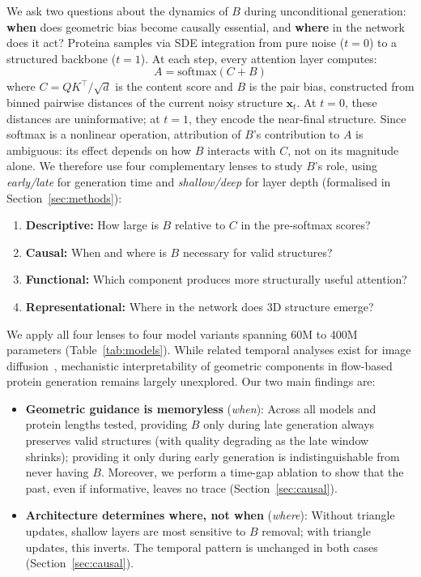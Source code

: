 \documentclass{article}
\begin{document}
We ask two questions about the dynamics of $B$ during unconditional generation: \textbf{when} does geometric bias become causally essential, and \textbf{where} in the network does it act?
Proteina samples via SDE integration from pure noise ($t{=}0$) to a structured backbone ($t{=}1$).
At each step, every attention layer computes:
\begin{equation}
    A = \mathrm{softmax}(C + B)
    \label{eq:attention}
\end{equation}
where $C = QK^\top / \sqrt{d}$ is the content score and $B$ is the pair bias, constructed from binned pairwise distances of the current noisy structure $\mathbf{x}_t$.
At $t{=}0$, these distances are uninformative; at $t{=}1$, they encode the near-final structure.
Since softmax is a nonlinear operation, attribution of $B$'s contribution to $A$ is ambiguous: its effect depends on how $B$ interacts with $C$, not on its magnitude alone. We therefore use four complementary lenses to study $B$'s role, using \emph{early/late} for generation time and \emph{shallow/deep} for layer depth (formalised in Section~\ref{sec:methods}):
\begin{enumerate}
    \item \textbf{Descriptive:} How large is $B$ relative to $C$ in the pre-softmax scores?
    \item \textbf{Causal:} When and where is $B$ necessary for valid structures?
    \item \textbf{Functional:} Which component produces more structurally useful attention?
    \item \textbf{Representational:} Where in the network does 3D structure emerge?
\end{enumerate}
We apply all four lenses to four model variants spanning 60M to 400M parameters (Table~\ref{tab:models}).
While related temporal analyses exist for image diffusion~\citep{kynkaanniemi2024guidance}, mechanistic interpretability of geometric components in flow-based protein generation remains largely unexplored.
Our two main findings are:
\begin{itemize}
    \item \textbf{Geometric guidance is memoryless} (\emph{when}): Across all models and protein lengths tested, providing $B$ only during late generation always preserves valid structures (with quality degrading as the late window shrinks); providing it only during early generation is indistinguishable from never having $B$. Moreover, we perform a time-gap ablation to show that the past, even if informative, leaves no trace (Section~\ref{sec:causal}).
    \item \textbf{Architecture determines where, not when} (\emph{where}): Without triangle updates, shallow layers are most sensitive to $B$ removal; with triangle updates, this inverts. The temporal pattern is unchanged in both cases (Section~\ref{sec:causal}).
\end{itemize}
\end{document}
